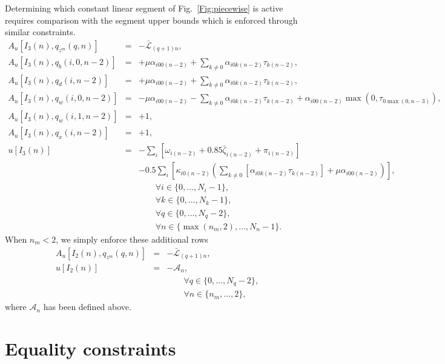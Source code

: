 \documentclass{report}[fleqn,11pt]
\begin{document}
Determining which constant linear segment of Fig.~\ref{Fig:piecewise}
is active requires comparison with the segment upper bounds which is enforced through similar constraints.
\begin{eqnarray}
	A_u[I_3(n), q_{z^m}(q, n)] &=& - \bar{\mathcal{L}}_{(q+1)n}, \nonumber \\
	A_u[I_3(n), q_{b}(i, 0, n-2)] &=&
	    + \mu \alpha_{i00(n-2)}
	    + \sum_{k\neq 0} \alpha_{i0k(n-2)}\tau_{k(n-2)},
	    \nonumber \\
	A_u[I_3(n), q_{d}(i, n-2)] &=&
	    + \mu \alpha_{i00(n-2)}
	    + \sum_{k\neq 0} \alpha_{i0k(n-2)}\tau_{k(n-2)},
	    \nonumber \\
	A_u[I_3(n), q_{w}(i, 0, n-2)] &=&
	    - \mu \alpha_{i00(n-2)}
	    - \sum_{k\neq 0} \alpha_{i0k(n-2)}\tau_{k(n-2)}
	    +\alpha_{i00(n-2)}\max(0, \tau_{0\max(0, n-3)}), \nonumber \\
	A_u[I_3(n), q_{w}(i, 1, n-2)] &=& +1, \nonumber \\
	A_u[I_3(n), q_{x}(i, n-2)] &=& +1, \nonumber \\
	u[I_3(n)] &=& - \sum_i \left[\omega_{i(n-2)} + 0.85\bar{\zeta}_{i(n-2)} + \pi_{i(n-2)} \right]\nonumber \\
	&& - 0.5 \sum_i \left[\kappa_{i0(n-2)}  \left(
	  \sum_{k\neq 0} [\alpha_{i0k(n-2)}\tau_{k(n-2)}] + \mu\alpha_{i00(n-2)}\right)\right],\nonumber\\
	&&\qquad\forall i \in \{0,\ldots, N_i - 1\}, \nonumber\\
	&&\qquad\forall k \in \{0,\ldots, N_k - 1\}, \nonumber\\
	&&\qquad\forall q \in \{0,\ldots, N_q - 2\}, \nonumber\\
	&&\qquad\forall n \in \{\max(n_m, 2),\ldots, N_n - 1\}.
\end{eqnarray}
When $n_m < 2$, we simply enforce these additional rows
\begin{eqnarray}
	A_u[I_2(n), q_{z^m}(q, n)] &=& -\bar{\mathcal{L}}_{(q+1)n}, \nonumber \\
	u[I_2(n)] &=& -\mathcal{A}_{n}, \nonumber \\
	&&\qquad\forall q \in \{0,\ldots, N_q - 2\}, \nonumber\\
	&&\qquad\forall n \in \{n_m,\ldots, 2\},
\end{eqnarray}
where $\mathcal{A}_n$ has been defined above.


\section{Equality constraints}
\end{document}
